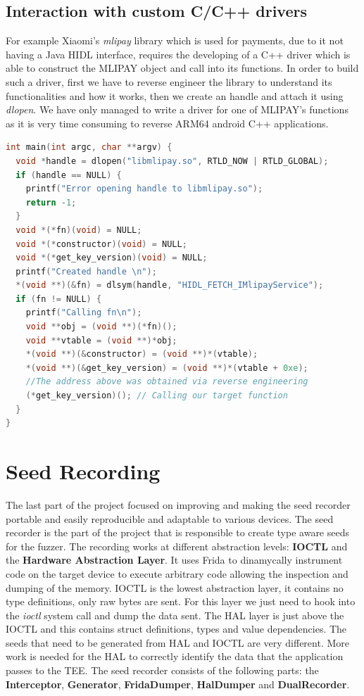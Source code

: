 \documentclass[a4paper,11pt,oneside]{report}
\begin{document}
\section{Interaction with custom C/C++ drivers}
For example Xiaomi's \emph{mlipay} library
which is used for payments, due to it not having a Java HIDL interface, requires the developing of a C++ driver  which is
able to construct the MLIPAY object and call into its functions. In order to
build such a driver, first we have to reverse engineer the library to
understand its functionalities and how it works, then we create an handle and
attach it using \emph{dlopen}.
We have only managed to write a driver for one of MLIPAY's functions as it is
very time consuming to reverse ARM64 android C++ applications.
\begin{lstlisting}[language=C++, caption= Example driver for mlipay]
int main(int argc, char **argv) {
  void *handle = dlopen("libmlipay.so", RTLD_NOW | RTLD_GLOBAL);
  if (handle == NULL) {
    printf("Error opening handle to libmlipay.so");
    return -1;
  }
  void *(*fn)(void) = NULL;
  void *(*constructor)(void) = NULL;
  void *(*get_key_version)(void) = NULL;
  printf("Created handle \n");
  *(void **)(&fn) = dlsym(handle, "HIDL_FETCH_IMlipayService");
  if (fn != NULL) {
    printf("Calling fn\n");
    void **obj = (void **)(*fn)();
    void **vtable = (void **)*obj;
    *(void **)(&constructor) = (void **)*(vtable);
    *(void **)(&get_key_version) = (void **)*(vtable + 0xe);
    //The address above was obtained via reverse engineering
    (*get_key_version)(); // Calling our target function
  }
}
\end{lstlisting}


\chapter{Seed Recording}
The last part of the project focused on improving and making the seed
recorder portable and easily reproducible and adaptable to various devices.
The seed recorder is the part of the project that is
responsible to create type aware seeds for the fuzzer.
The recording works at different abstraction levels:
\textbf{IOCTL} and the \textbf{Hardware Abstraction Layer}.
It uses Frida to dinamycally instrument code on the target device to execute arbitrary code allowing the inspection and dumping of the memory.
IOCTL is the lowest abstraction layer, it contains no
type definitions, only raw bytes are sent. For this
layer we just need to hook into the \emph{ioctl} system
call and dump the data sent.
The HAL layer is just above the IOCTL and this contains struct definitions, types and value dependencies.
The seeds that need to be generated from HAL and IOCTL are very different. More work is needed for the HAL to correctly identify the data that the
application passes to the TEE.
The seed recorder consists of the following parts: the \textbf{Interceptor}, \textbf{Generator}, \textbf{FridaDumper}, \textbf{HalDumper} and \textbf{DualRecorder}.
\end{document}
